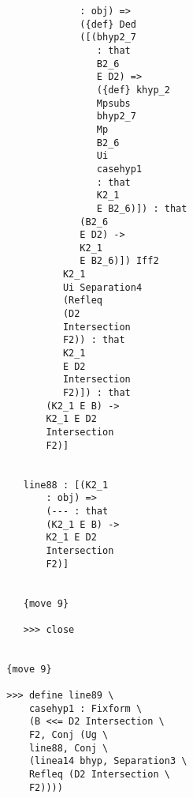 \documentclass[12pt]{article}
\begin{document}
\begin{verbatim}
                                        : obj) => 
                                        ({def} Ded 
                                        ([(bhyp2_7 
                                           : that 
                                           B2_6 
                                           E D2) => 
                                           ({def} khyp_2 
                                           Mpsubs 
                                           bhyp2_7 
                                           Mp 
                                           B2_6 
                                           Ui 
                                           casehyp1 
                                           : that 
                                           K2_1 
                                           E B2_6)]) : that 
                                        (B2_6 
                                        E D2) -> 
                                        K2_1 
                                        E B2_6)]) Iff2 
                                     K2_1 
                                     Ui Separation4 
                                     (Refleq 
                                     (D2 
                                     Intersection 
                                     F2)) : that 
                                     K2_1 
                                     E D2 
                                     Intersection 
                                     F2)]) : that 
                                  (K2_1 E B) -> 
                                  K2_1 E D2 
                                  Intersection 
                                  F2)]


                              line88 : [(K2_1 
                                  : obj) => 
                                  (--- : that 
                                  (K2_1 E B) -> 
                                  K2_1 E D2 
                                  Intersection 
                                  F2)]


                              {move 9}

                              >>> close


                           {move 9}

                           >>> define line89 \
                               casehyp1 : Fixform \
                               (B <<= D2 Intersection \
                               F2, Conj (Ug \
                               line88, Conj \
                               (linea14 bhyp, Separation3 \
                               Refleq (D2 Intersection \
                               F2))))



\end{verbatim}
\end{document}
